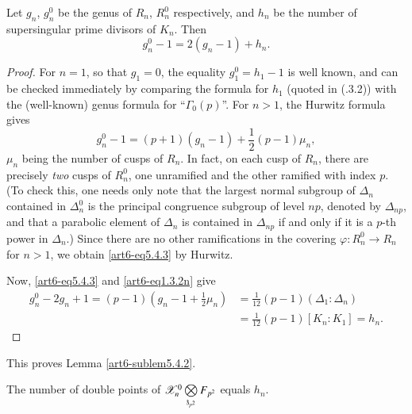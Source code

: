 \setcounter{sublemma}{1}
\begin{sublemma}\label{art6-sublem5.4.2}
Let $g_n$, $g^0_n$ be the genus of $R_n$, $R^0_n$ respectively, and $h_n$ be the number of supersingular prime divisors of $K_n$. Then
$$
g^0_n -1  = 2 (g_n - 1) + h_n .
$$
\end{sublemma}

\begin{proof}
For $n = 1$, so that $g_1 = 0$, the equality $g^0_1 = h_1 -1$ is well known, and can be checked immediately by comparing the formula for $h_1$ (quoted in (.3.2)) with the (well-known) genus formula for ``$\Gamma_0 (p)$''. For $n>1$, the Hurwitz formula gives
\setcounter{equation}{2}
\begin{equation}
g^0_n - 1 = (p+1) (g_n - 1) + \frac{1}{2} (p-1) \mu_n, \label{art6-eq5.4.3}
\end{equation}
$\mu_n$ being the number of cusps of $R_n$. In fact, on each cusp of $R_n$, there are precisely \textit{two} cusps of $R^0_n$, one unramified and the other ramified with index $p$. (To check this, one needs only note that the largest normal subgroup of $\Delta_n$ contained in $\Delta^0_n$ is the principal congruence subgroup of level $np$, denoted by $\Delta_{np}$, and that a parabolic element of $\Delta_n$ is contained in $\Delta_{np}$ if and only if it is a $p$-th power in $\Delta_n$.) Since there are no other ramifications in the covering $\varphi: R^0_n \to R_n$ for $n >1$, we obtain \eqref{art6-eq5.4.3} by Hurwitz.

Now, \eqref{art6-eq5.4.3} and \ref{art6-eq1.3.2n} give
\begin{align*}
g^0_n - 2 g_n  +1 = (p-1) (g_n - 1 + \frac{1}{2} \mu_n) & = \frac{1}{12} (p-1) (\Delta_1 : \Delta_n)\\
& = \frac{1}{12} (p-1) [K_n : K_1] = h_n.
\end{align*}
\end{proof}
This proves Lemma \ref{art6-sublem5.4.2}.


\setcounter{sublemma}{3}
\begin{sublemma}\label{art6-sublem5.4.4}
The number of double points of $\mathscr{X}^0_n \bigotimes\limits_{\mathfrak{z}_{p^2}} F_{p^2}$ equals $h_n$.
\end{sublemma}

